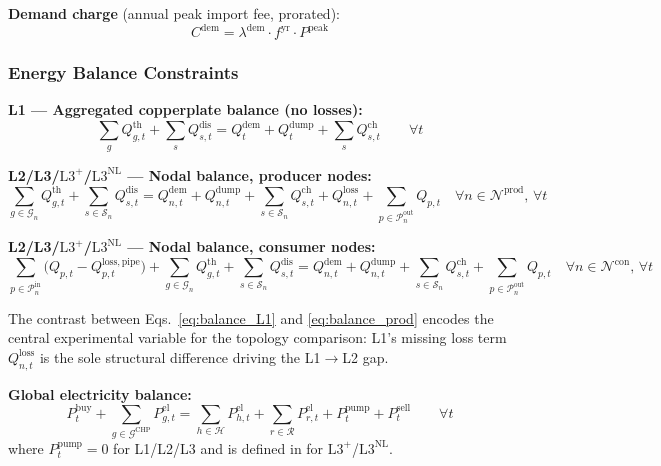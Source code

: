 \documentclass[review,3p]{elsarticle}
\newcommand{\Lplus}{\mathrm{L3}^{+}}
\newcommand{\Lnl}{\mathrm{L3}^{\mathrm{NL}}}
\begin{document}
\textbf{Demand charge} (annual peak import fee, prorated):
\begin{equation}
C^{\mathrm{dem}} = \lambda^{\mathrm{dem}} \cdot f^{\mathrm{yr}}
\cdot P^{\mathrm{peak}}
\label{eq:cost_demand}
\end{equation}

\subsubsection{Energy Balance Constraints}
\label{sec:model_balance}

\textbf{L1 --- Aggregated copperplate balance (no losses):}
\begin{equation}
\sum_{g} Q_{g,t}^{\mathrm{th}}
+ \sum_{s} Q_{s,t}^{\mathrm{dis}}
= Q_t^{\mathrm{dem}} + Q_t^{\mathrm{dump}}
+ \sum_{s} Q_{s,t}^{\mathrm{ch}}
\qquad \forall t
\label{eq:balance_L1}
\end{equation}

\textbf{L2/L3/$\Lplus$/$\Lnl$ --- Nodal balance, producer nodes:}
\begin{equation}
\sum_{g \in \mathcal{G}_n} Q_{g,t}^{\mathrm{th}}
+ \sum_{s \in \mathcal{S}_n} Q_{s,t}^{\mathrm{dis}}
= Q_{n,t}^{\mathrm{dem}} + Q_{n,t}^{\mathrm{dump}}
+ \sum_{s \in \mathcal{S}_n} Q_{s,t}^{\mathrm{ch}}
+ Q_{n,t}^{\mathrm{loss}}
+ \sum_{p \in \mathcal{P}_n^{\mathrm{out}}} Q_{p,t}
\quad \forall n \in \mathcal{N}^{\mathrm{prod}},\, \forall t
\label{eq:balance_prod}
\end{equation}

\textbf{L2/L3/$\Lplus$/$\Lnl$ --- Nodal balance, consumer nodes:}
\begin{equation}
\sum_{p \in \mathcal{P}_n^{\mathrm{in}}} \big(Q_{p,t}
- Q_{p,t}^{\mathrm{loss,pipe}}\big)
+ \sum_{g \in \mathcal{G}_n} Q_{g,t}^{\mathrm{th}}
+ \sum_{s \in \mathcal{S}_n} Q_{s,t}^{\mathrm{dis}}
= Q_{n,t}^{\mathrm{dem}} + Q_{n,t}^{\mathrm{dump}}
+ \sum_{s \in \mathcal{S}_n} Q_{s,t}^{\mathrm{ch}}
+ \sum_{p \in \mathcal{P}_n^{\mathrm{out}}} Q_{p,t}
\quad \forall n \in \mathcal{N}^{\mathrm{con}},\, \forall t
\label{eq:balance_consumer}
\end{equation}

The contrast between Eqs.~\eqref{eq:balance_L1} and
\eqref{eq:balance_prod} encodes the central experimental variable
for the topology comparison: L1's missing loss term
$Q_{n,t}^{\mathrm{loss}}$ is the sole structural difference driving
the L1$\to$L2 gap.

\textbf{Global electricity balance:}
\begin{equation}
P_t^{\mathrm{buy}} + \sum_{g \in \mathcal{G}^{\mathrm{CHP}}}
P_{g,t}^{\mathrm{el}}
= \sum_{h \in \mathcal{H}} P_{h,t}^{\mathrm{el}}
+ \sum_{r \in \mathcal{R}} P_{r,t}^{\mathrm{el}}
+ P_t^{\mathrm{pump}}
+ P_t^{\mathrm{sell}}
\qquad \forall t
\label{eq:balance_el}
\end{equation}
where $P_t^{\mathrm{pump}} = 0$ for L1/L2/L3 and is defined in
 for $\Lplus$/$\Lnl$.
\end{document}
